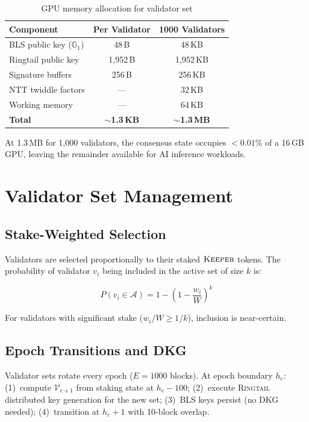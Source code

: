 \documentclass[11pt,letterpaper]{article}
\theoremstyle{definition}
\theoremstyle{remark}
\newcommand{\Ringtail}{\textsc{Ringtail}}
\begin{document}
\begin{table}[h]
\centering
\begin{tabular}{lcc}
\toprule
\textbf{Component} & \textbf{Per Validator} & \textbf{1000 Validators} \\
\midrule
BLS public key ($\mathbb{G}_1$) & 48\,B & 48\,KB \\
Ringtail public key & 1,952\,B & 1,952\,KB \\
Signature buffers & 256\,B & 256\,KB \\
NTT twiddle factors & --- & 32\,KB \\
Working memory & --- & 64\,KB \\
\midrule
\textbf{Total} & \textbf{$\sim$1.3\,KB} & \textbf{$\sim$1.3\,MB} \\
\bottomrule
\end{tabular}
\caption{GPU memory allocation for validator set}
\label{tab:gpu-mem}
\end{table}

At 1.3\,MB for 1,000 validators, the consensus state occupies $< 0.01\%$ of a 16\,GB GPU, leaving the remainder available for AI inference workloads.

\section{Validator Set Management}

\subsection{Stake-Weighted Selection}

Validators are selected proportionally to their staked $\textsc{Keeper}$ tokens. The probability of validator $v_i$ being included in the active set of size $k$ is:

\begin{equation}
P(v_i \in \mathcal{A}) = 1 - \left(1 - \frac{w_i}{W}\right)^k
\end{equation}

For validators with significant stake ($w_i / W \geq 1/k$), inclusion is near-certain.

\subsection{Epoch Transitions and DKG}

Validator sets rotate every epoch ($E = 1000$ blocks). At epoch boundary $h_e$: (1)~compute $\mathcal{V}_{e+1}$ from staking state at $h_e - 100$; (2)~execute \Ringtail{} distributed key generation for the new set; (3)~BLS keys persist (no DKG needed); (4)~transition at $h_e + 1$ with 10-block overlap.
\end{document}
